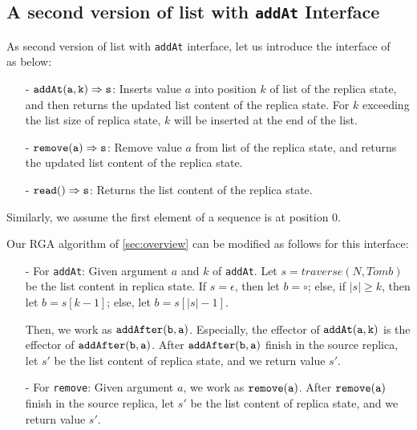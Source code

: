 \subsection{A second version of list with {\tt addAt} Interface}
\label{subsec:a second version of list with addAt interface}

As second version of list with {\tt addAt} interface, let us introduce the interface of ~\cite{AttiyaBGMYZ16} as below:

\begin{itemize}
\setlength{\itemsep}{0.5pt}
\item[-] $\alabellong[{\tt addAt}]{a,k}{s}{}$: Inserts value $a$ into position $k$ of list of the replica state, and then returns the updated list content of the replica state. For $k$ exceeding the list size of replica state, $k$ will be inserted at the end of the list.

\item[-] $\alabellong[{\tt remove}]{a}{s}{}$: Remove value $a$ from list of the replica state, and returns the updated list content of the replica state.

\item[-] $\alabellong[{\tt read}]{}{s}{}$: Returns the list content of the replica state.
\end{itemize}

Similarly, we assume the first element of a sequence is at position $0$.

Our RGA algorithm of \sectionautorefname \ref{sec:overview} can be modified as follows for this interface:

\begin{itemize}
\setlength{\itemsep}{0.5pt}
\item[-] For {\tt addAt}: Given argument $a$ and $k$ of {\tt addAt}. Let $s = traverse(N, Tomb)$ be the list content in replica state. If $s = \epsilon$, then let $b = \circ$; else, if $\vert s \vert \geq k$, then let $b=s[k-1]$; else, let $b=s[\vert s \vert -1]$.

    Then, we work as $\alabelshort[{\tt addAfter}]{b,a}$. Especially, the effector of $\alabelshort[{\tt addAt}]{a,k}$ is the effector of $\alabelshort[{\tt addAfter}]{b,a}$. After $\alabelshort[{\tt addAfter}]{b,a}$ finish in the source replica, let $s'$ be the list content of replica state, and we return value $s'$.

\item[-] For {\tt remove}: Given argument $a$, we work as $\alabelshort[{\tt remove}]{a}$. After $\alabelshort[{\tt remove}]{a}$ finish in the source replica, let $s'$ be the list content of replica state, and we return value $s'$.
\end{itemize}




